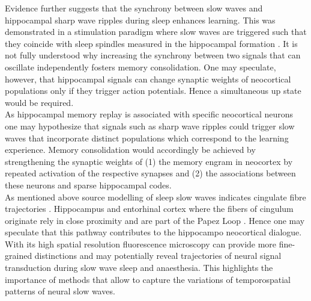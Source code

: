 Evidence further suggests that the synchrony between slow waves and hippocampal sharp wave ripples during sleep enhances learning. This was demonstrated in a stimulation paradigm where slow waves are triggered such that they coincide with sleep spindles measured in the hippocampal formation \parencite{maingret2016hippocampo}. It is not fully understood why increasing the synchrony between two signals that can oscillate independently fosters memory consolidation. One may speculate, however, that hippocampal signals can change synaptic weights of neocortical populations only if they trigger action potentials. Hence a simultaneous up state would be required.\\
As hippocampal memory replay is associated with specific neocortical neurons one may hypothesize that signals such as sharp wave ripples could trigger slow waves that incorporate distinct populations which correspond to the learning experience. Memory consolidation would accordingly be achieved by strengthening the synaptic weights of (1) the memory engram in neocortex by repeated activation of the respective synapses and (2) the associations between these neurons and sparse hippocampal codes.\\
 As mentioned above source modelling of sleep slow waves indicates cingulate fibre trajectories \parencite{murphy2009source}. Hippocampus and entorhinal cortex where the fibers of cingulum originate rely in close proximity and are part of the Papez Loop \parencite{choi2019papez}. Hence one may speculate that this pathway contributes to the hippocampo neocortical dialogue. With its high spatial resolution fluorescence microscopy can provide more fine-grained distinctions and may potentially reveal trajectories of neural signal transduction during slow wave sleep and anaesthesia. This highlights the importance of methods that allow to capture the variations of temporospatial patterns of neural slow waves.\\
